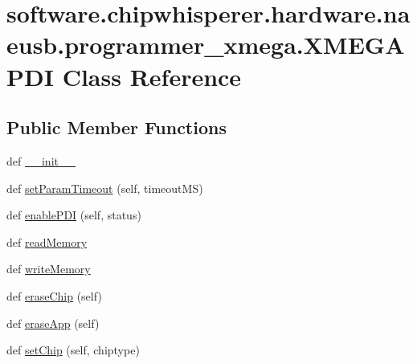 \hypertarget{classsoftware_1_1chipwhisperer_1_1hardware_1_1naeusb_1_1programmer__xmega_1_1XMEGAPDI}{}\section{software.\+chipwhisperer.\+hardware.\+naeusb.\+programmer\+\_\+xmega.\+X\+M\+E\+G\+A\+P\+D\+I Class Reference}
\label{classsoftware_1_1chipwhisperer_1_1hardware_1_1naeusb_1_1programmer__xmega_1_1XMEGAPDI}
\subsection*{Public Member Functions}
\begin{DoxyCompactItemize}
\item 
def \hyperlink{classsoftware_1_1chipwhisperer_1_1hardware_1_1naeusb_1_1programmer__xmega_1_1XMEGAPDI_a34788adcc1c78dfad4225afe3f278102}{\+\_\+\+\_\+init\+\_\+\+\_\+}
\item 
def \hyperlink{classsoftware_1_1chipwhisperer_1_1hardware_1_1naeusb_1_1programmer__xmega_1_1XMEGAPDI_aed2a15c46c5d39f174358456b128337e}{set\+Param\+Timeout} (self, timeout\+M\+S)
\item 
def \hyperlink{classsoftware_1_1chipwhisperer_1_1hardware_1_1naeusb_1_1programmer__xmega_1_1XMEGAPDI_a5d64ae2f8cad5c764c7d54e62efc6a70}{enable\+P\+D\+I} (self, status)
\item 
def \hyperlink{classsoftware_1_1chipwhisperer_1_1hardware_1_1naeusb_1_1programmer__xmega_1_1XMEGAPDI_a9aff0e9c766ac9b74e3e1ec6074c79e3}{read\+Memory}
\item 
def \hyperlink{classsoftware_1_1chipwhisperer_1_1hardware_1_1naeusb_1_1programmer__xmega_1_1XMEGAPDI_a6bd915fe8154e77d629915c3b0e942d8}{write\+Memory}
\item 
def \hyperlink{classsoftware_1_1chipwhisperer_1_1hardware_1_1naeusb_1_1programmer__xmega_1_1XMEGAPDI_af8929441996f6a8c4e1eb7ab67f6b960}{erase\+Chip} (self)
\item 
def \hyperlink{classsoftware_1_1chipwhisperer_1_1hardware_1_1naeusb_1_1programmer__xmega_1_1XMEGAPDI_a3f350bdb7d0ef0bd823c160ad12db0a5}{erase\+App} (self)
\item 
def \hyperlink{classsoftware_1_1chipwhisperer_1_1hardware_1_1naeusb_1_1programmer__xmega_1_1XMEGAPDI_aba0502f09bbc01f782fa4db26bb57a0a}{set\+Chip} (self, chiptype)
\end{DoxyCompactItemize}
